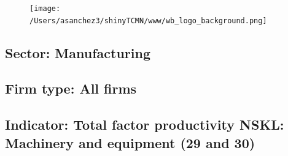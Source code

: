 \documentclass{article}\usepackage[]{graphicx}\usepackage[]{color}
\begin{document}
%

\begin{figure}
  \vspace{-3ex} %
  \hspace{-7ex} %
  \texttt{[image: /Users/asanchez3/shinyTCMN/www/wb\_logo\_background.png]}
\end{figure}
 \begin{minipage}[t]{1.1\textwidth} %
      \vspace{-30ex}
      \hspace{10ex}
  \end{minipage}
  
%
\begin{minipage}[t]{0.99\textwidth} %
  \vspace{-0.5cm}
      \subsection*{\color{white!40!black}Sector: \color{blue!40!black}Manufacturing}
      \subsection*{\color{white!40!black}Firm type: \color{blue!40!black}All firms}
      \subsection*{\color{white!40!black}Indicator: \color{blue!40!black}Total factor productivity NSKL: Machinery and equipment (29 and 30)}
  \end{minipage} %
\end{document}
